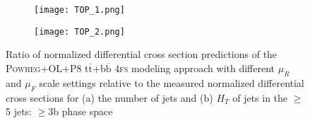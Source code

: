 \begin{figure}[H]
    \centering
    \begin{subfigure}{0.49\textwidth}
        \texttt{[image: TOP\_1.png]}
        \caption{}
    \end{subfigure}
    \begin{subfigure}{0.49\textwidth}
        \texttt{[image: TOP\_2.png]}
        \caption{}
    \end{subfigure}
    \caption{Ratio of normalized differential cross section predictions of the \textsc{Powheg}+OL+P8 t$\overline{\text{t}}$+b$\overline{\text{b}}$ \textsc{4fs} modeling approach with different $\mu_R$ and $\mu_F$ scale settings relative to the measured normalized differential cross sections for (a) the number of jets and (b) $H_T$ of jets in the $\geq$5 jets: $\geq$3b phase space \cite{TOP-22-009}}
    \label{fig:TOP-22-009_1}
\end{figure}
